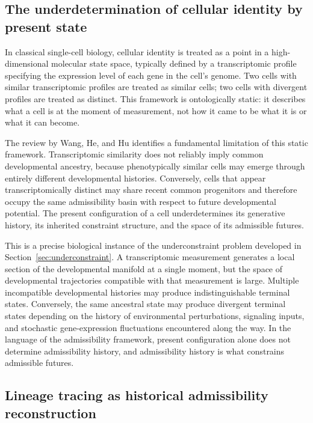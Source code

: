 \documentclass[12pt, a4paper]{article}
\theoremstyle{plain}
\theoremstyle{definition}
\theoremstyle{remark}
\begin{document}
\subsection{The underdetermination of cellular identity by present state}

In classical single-cell biology, cellular identity is treated as a
point in a high-dimensional molecular state space, typically defined by a
transcriptomic profile specifying the expression level of each gene in the
cell's genome.
Two cells with similar transcriptomic profiles are treated as similar
cells; two cells with divergent profiles are treated as distinct.
This framework is ontologically static: it describes what a cell is at
the moment of measurement, not how it came to be what it is or what it
can become.

The review by Wang, He, and Hu identifies a fundamental limitation of this
static framework.
Transcriptomic similarity does not reliably imply common developmental
ancestry, because phenotypically similar cells may emerge through entirely
different developmental histories.
Conversely, cells that appear transcriptomically distinct may share recent
common progenitors and therefore occupy the same admissibility basin with
respect to future developmental potential.
The present configuration of a cell underdetermines its generative history,
its inherited constraint structure, and the space of its admissible futures.

This is a precise biological instance of the underconstraint problem
developed in Section~\ref{sec:underconstraint}.
A transcriptomic measurement generates a local section of the developmental
manifold at a single moment, but the space of developmental trajectories
compatible with that measurement is large.
Multiple incompatible developmental histories may produce indistinguishable
terminal states.
Conversely, the same ancestral state may produce divergent terminal states
depending on the history of environmental perturbations, signaling inputs,
and stochastic gene-expression fluctuations encountered along the way.
In the language of the admissibility framework, present configuration alone
does not determine admissibility history, and admissibility history is what
constrains admissible futures.

\subsection{Lineage tracing as historical admissibility reconstruction}
\end{document}
